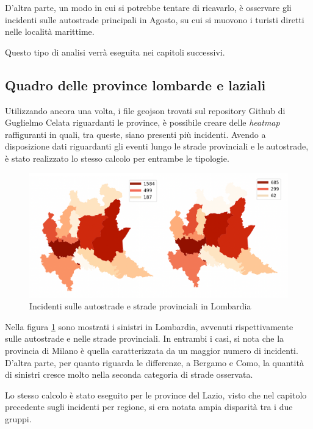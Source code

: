 \documentclass[a4paper]{report}
\newcommand{\quotestyle}[1]{\textit{#1}}
\begin{document}
D'altra parte, un modo in cui si potrebbe tentare di ricavarlo, è osservare gli 
incidenti sulle autostrade principali in Agosto, su cui si muovono i turisti diretti 
nelle località marittime. 

Questo tipo di analisi verrà eseguita nei capitoli successivi. 

\subsection{Quadro delle province lombarde e laziali}

Utilizzando ancora una volta, i file geojson trovati sul repository Github di 
Guglielmo Celata riguardanti le province, 
è possibile creare delle \quotestyle{heatmap} raffiguranti in quali, tra queste, siano 
presenti più incidenti. 
Avendo a disposizione dati riguardanti gli eventi lungo le strade provinciali e le autostrade, 
è stato realizzato lo stesso calcolo per entrambe le tipologie. 

\begin{figure}
    \includegraphics[width=\linewidth]{img_unite/lombardia_autostrade_provinciali.png}
    \caption{Incidenti sulle autostrade e strade provinciali in Lombardia}
    \label{fig:lombardia-strade}
\end{figure}

Nella figura \ref{fig:lombardia-strade} sono mostrati i sinistri in Lombardia, 
avvenuti rispettivamente sulle autostrade e nelle strade provinciali. 
In entrambi i casi, si nota che la provincia di Milano è quella caratterizzata da 
un maggior numero di incidenti. 
D'altra parte, per quanto riguarda le differenze, a Bergamo e Como, 
la quantità di sinistri cresce molto nella seconda categoria di strade osservata. 

Lo stesso calcolo è stato eseguito per le province del Lazio, visto che nel capitolo 
precedente sugli incidenti per regione, si era notata ampia disparità tra i due gruppi. 
\end{document}
